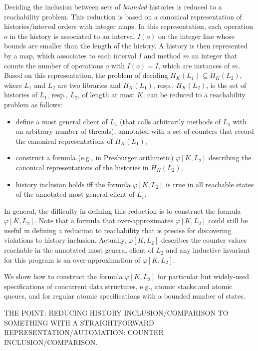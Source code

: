 Deciding the inclusion between sets of \emph{bounded} histories is reduced to a reachability problem. This reduction
is based on a canonical representation of histories/interval orders with integer maps. In this representation, each operation $o$ in the history
is associated to an interval $I(o)$ on the integer line whose bounds are smaller than the length of the history. A history is then 
represented by a map, which associates to each interval $I$ and method $m$ an integer that counts the number of operations 
$o$ with $I(o)=I$, which are instances of $m$. Based on this representation, the problem of deciding $H_K(L_1)\subseteq H_K(L_2)$, where
$L_1$ and $L_2$ are two libraries and $H_K(L_1)$, resp., $H_K(L_2)$, is the set of histories of $L_1$, resp., $L_2$, of length at most $K$, can be reduced to
a reachability problem as follows:
\begin{itemize}
	\item define a most general client of $L_1$ (that calls arbitrarily methods of $L_1$ with an arbitrary number of threads), annotated 
with a set of counters that record the canonical representations of $H_K(L_1)$,
	\item construct a formula (e.g., in Presburger arithmetic) $\varphi[K,L_2]$ describing the canonical representations of the histories in $H_K(L_2)$,
	\item history inclusion holds iff the formula $\varphi[K,L_2]$ is true in all reachable states of the annotated most general client of $L_1$.
\end{itemize}

In general, the difficulty in defining this reduction is to construct the formula $\varphi[K,L_2]$. 
Note that a formula that over-approximates $\varphi[K,L_2]$ could still be useful in defining a reduction to reachability 
that is precise for discovering violations to history inclusion. Actually, $\varphi[K,L_2]$ describes the counter values reachable
in the annotated most general client of $L_2$ and any inductive invariant for this program is an over-approximation of $\varphi[K,L_2]$. 

We show how to construct the formula $\varphi[K,L_2]$ for particular but widely-used specifications of concurrent data structures, 
e.g., atomic stacks and atomic queues, and for regular atomic specifications with a bounded number of states.

THE POINT: REDUCING HISTORY INCLUSION/COMPARISON TO SOMETHING WITH A
STRAIGHTFORWARD REPRESENTATION/AUTOMATION: COUNTER INCLUSION/COMPARISON.

